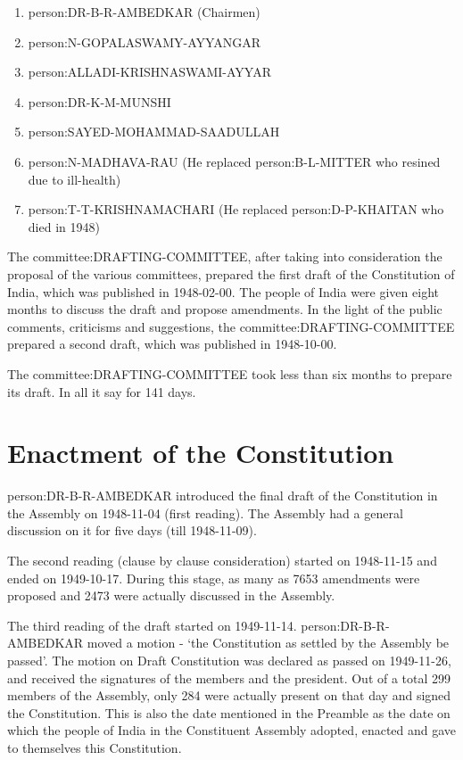 \begin{enumerate}
  \item \gls{person:DR-B-R-AMBEDKAR} ({ Chairmen})
  \item \gls{person:N-GOPALASWAMY-AYYANGAR}
  \item \gls{person:ALLADI-KRISHNASWAMI-AYYAR}
  \item \gls{person:DR-K-M-MUNSHI}
  \item \gls{person:SAYED-MOHAMMAD-SAADULLAH}
  \item \gls{person:N-MADHAVA-RAU} (He replaced \gls{person:B-L-MITTER} who resined due to ill-health)
  \item \gls{person:T-T-KRISHNAMACHARI} (He replaced \gls{person:D-P-KHAITAN} who died in 1948)
\end{enumerate}

The \gls{committee:DRAFTING-COMMITTEE}, after taking into consideration the proposal of the various committees, prepared the first draft of the Constitution of India, which was published in 1948-02-00. The people of India were given eight months to discuss the draft and propose amendments. In the light of the public comments, criticisms and suggestions, the \gls{committee:DRAFTING-COMMITTEE} prepared a second draft, which was published in 1948-10-00.

The \gls{committee:DRAFTING-COMMITTEE} took less than six months to prepare its draft. In all it say for 141 days.

\section{Enactment of the Constitution}

\gls{person:DR-B-R-AMBEDKAR} introduced the final draft of the Constitution in the Assembly on 1948-11-04 (first reading). The Assembly had a general discussion on it for five days (till 1948-11-09).

The second reading (clause by clause consideration) started on 1948-11-15 and ended on 1949-10-17. During this stage, as many as 7653 amendments were proposed and 2473 were actually discussed in the Assembly.

The third reading of the draft started on 1949-11-14. \gls{person:DR-B-R-AMBEDKAR} moved a motion - `the Constitution as settled by the Assembly be passed'. The motion on Draft Constitution was declared as passed on 1949-11-26, and received the signatures of the members and the president. Out of a total 299 members of the Assembly, only 284 were actually present on that day and signed the Constitution. This is also the date mentioned in the Preamble as the date on which the people of India in the Constituent Assembly adopted, enacted and gave to themselves this Constitution.

